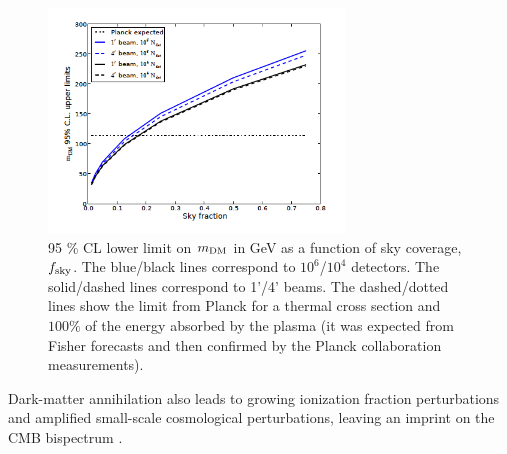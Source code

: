 \begin{figure}[t]
\begin{center}
\includegraphics[width=0.7\textwidth]{DarkEnergy/DM_annihilation_CMBS4.png}
\caption{95 \% CL lower limit on $m_{\rm DM}$ in GeV as a function of sky coverage, $f_{\rm sky}$.
The blue/black lines correspond to $10^6$/$10^4$ detectors. The solid/dashed lines correspond to 1'/4' beams.
The dashed/dotted lines show the limit from Planck for a thermal cross section and $100\%$ of the energy absorbed by the plasma (it was expected from Fisher forecasts and then confirmed by the Planck collaboration measurements).}\label{fig:DM_annihilation}
\end{center}
\end{figure}

Dark-matter annihilation also leads to growing ionization fraction perturbations and amplified small-scale cosmological perturbations, leaving an imprint on the CMB bispectrum \cite{Dvorkin:2013cga}.

%
